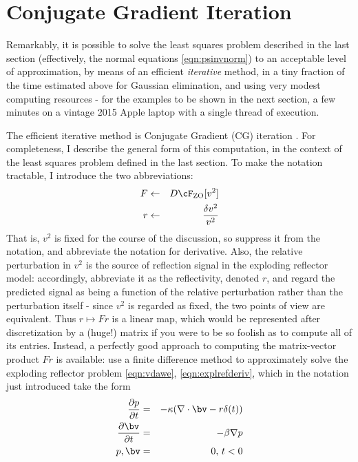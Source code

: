 \section{Conjugate Gradient Iteration}
Remarkably, it is possible to solve the least squares problem described in the last section (effectively, the normal equations \ref{eqn:psinvnorm}) to an acceptable level of approximation, by means of an efficient {\em iterative} method, in a tiny fraction of the time estimated above for Gaussian elimination, and using very modest computing resources - for the examples to be shown in the next section, a few minutes on a vintage 2015 Apple laptop with a single thread of execution.

The efficient iterative method is Conjugate Gradient (CG) iteration \cite[]{NocedalWright,Golub:2012}. For completeness, I describe the general form of this computation, in the context of the least squares problem defined in the last section. To make the notation tractable, I introduce the two abbreviations:
\begin{eqnarray}
\label{eqn:Fdef}
F & \leftarrow & D\cF_{\rm ZO}[v^2]\nonumber \\
r & \leftarrow & \frac{\delta v^2}{v^2}
\end{eqnarray}
That is, $v^2$ is fixed for the course of the discussion, so suppress it from the notation, and abbreviate the notation for derivative. Also, the relative perturbation in $v^2$ is the source of reflection signal in the exploding reflector model: accordingly, abbreviate it as the reflectivity, denoted $r$, and regard the predicted signal as being a function of the relative perturbation rather than the perturbation itself - since $v^2$ is regarded as fixed, the two points of view are equivalent. Thus $r \mapsto Fr$ is a linear map, which would be represented after discretization by a (huge!) matrix if you were to be so foolish as to compute all of its entries. Instead, a perfectly good approach to computing the matrix-vector product $F r$ is available: use a finite difference method to approximately solve the exploding reflector problem \ref{eqn:vdawe}, \ref{eqn:explrefderiv}, which in the notation just introduced take the form
\begin{eqnarray}
\label{eqn:vdawer}
\frac{\partial p}{\partial t}&=& -\kappa (\nabla \cdot \bv - r \delta(t)) \nonumber \\
\frac{\partial \bv}{\partial t} &=& -\beta \nabla p\nonumber \\
p,\bv & = & 0, \,t<0 
\end{eqnarray}

